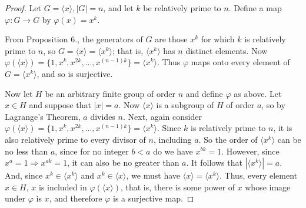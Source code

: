 \documentclass{article}
\begin{document}
\begin{proof}
    Let $G = \langle x \rangle, |G| = n$, and let $k$ be relatively prime to $n$. Define a map $\varphi: G \rightarrow G$ by $\varphi(x) = x^k$.

    From Proposition 6., the generators of $G$ are those $x^k$ for which $k$ is relatively prime to $n$, so $G = \langle x \rangle = \langle x^k \rangle$; that is, $\langle x^k \rangle$ has $n$ distinct elements. Now $\varphi(\langle x \rangle) = \{ 1, x^k, x^{2k}, ..., x^{(n - 1)k} \} = \langle x^k \rangle$. Thus $\varphi$ maps onto every element of $G = \langle x^k \rangle$, and so is surjective.

    Now let $H$ be an arbitrary finite group of order $n$ and define $\varphi$ as above. Let $x \in H$ and suppose that $|x| = a$. Now $\langle x \rangle$ is a subgroup of $H$ of order $a$, so by Lagrange's Theorem, $a$ divides $n$. Next, again consider $\varphi(\langle x \rangle) = \{ 1, x^k, x^{2k}, ..., x^{(n - 1)k} \} = \langle x^k \rangle$. Since $k$ is relatively prime to $n$, it is also relatively prime to every divisor of $n$, including $a$. So the order of $\langle x^k \rangle$ can be no less than $a$, since for no integer $b < a$ do we have $x^{bk} = 1$. However, since $x^a = 1 \Rightarrow x^{ak} = 1$, it can also be no greater than $a$. It follows that $|\langle x^k \rangle| = a$. And, since $x^k \in \langle x^k \rangle$ and $x^k \in \langle x \rangle$, we must have $\langle x \rangle = \langle x^k \rangle$. Thus, every element $x \in H$, $x$ is included in $\varphi(\langle x \rangle)$, that is, there is some power of $x$ whose image under $\varphi$ is $x$, and therefore $\varphi$ is a surjective map.
\end{proof}
\end{document}
